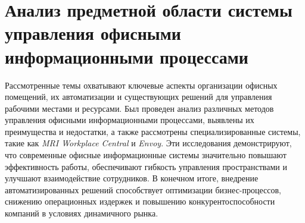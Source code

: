 \section{Анализ предметной области системы управления офисными информационными процессами}
\label{sec:domain}






Рассмотренные темы охватывают ключевые аспекты организации офисных помещений, их автоматизации и существующих решений для управления рабочими местами и ресурсами. Был проведен анализ различных методов управления офисными информационными процессами, выявлены их преимущества и недостатки, а также рассмотрены специализированные системы, такие как \textit{MRI Workplace Central} и \textit{Envoy}. Эти исследования демонстрируют, что современные офисные информационные системы значительно повышают эффективность работы, обеспечивают гибкость управления пространствами и улучшают взаимодействие сотрудников. В конечном итоге, внедрение автоматизированных решений способствует оптимизации бизнес-процессов, снижению операционных издержек и повышению конкурентоспособности компаний в условиях динамичного рынка.
